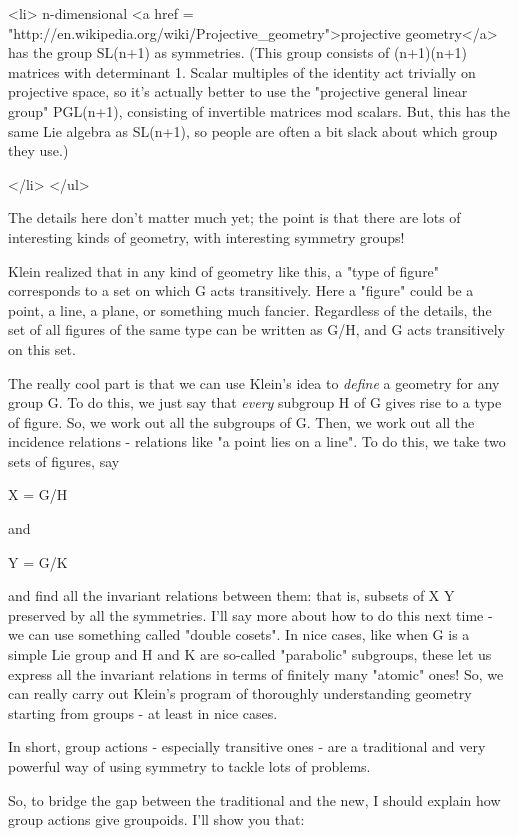 <li>
 n-dimensional <a href =
 "http://en.wikipedia.org/wiki/Projective_geometry">projective
 geometry</a> has the group SL(n+1) as symmetries.  (This group
 consists of (n+1)\times (n+1) matrices with determinant 1.  
 Scalar multiples of the
 identity act trivially on projective space, so it's actually better
 to use the "projective general linear group" PGL(n+1),
 consisting of invertible matrices mod scalars.  But, this has
 the same Lie algebra as SL(n+1), so people are often a bit slack about 
 which group they use.)
    
</li> 
</ul>

The details here don't matter much yet; the point is that there are lots
of interesting kinds of geometry, with interesting symmetry groups!

Klein realized that in any kind of geometry like this, a "type of
figure" corresponds to a set on which G acts transitively.  Here 
a "figure" could be a point, a line, a plane, or something 
much fancier.  Regardless of the details, the set of all figures of 
the same type can be written as G/H, and G acts transitively on this set.

The really cool part is that we can use Klein's idea to
\emph{define} a geometry for any group G.  To do this, we just say
that \emph{every} subgroup H of G gives rise to a type of figure.  So, we
work out all the subgroups of G.  Then, we work out all the incidence
relations - relations like "a point lies on a line".  To do
this, we take two sets of figures, say

X = G/H 

and 

Y = G/K

and find all the invariant relations between them: that is, subsets of
X \times  Y preserved by all the symmetries.  I'll say more about how to
do this next time - we can use something called "double
cosets".  In nice cases, like when G is a simple Lie group and H
and K are so-called "parabolic" subgroups, these let us express
all the invariant relations in terms of finitely many
"atomic" ones!  So, we can really carry out Klein's program
of thoroughly understanding geometry starting from groups - at least
in nice cases.

In short, group actions - especially transitive ones - are a traditional 
and very powerful way of using symmetry to tackle lots of problems.  

So, to bridge the gap between the traditional and the new, I should
explain how group actions give groupoids.  I'll show you that: 

